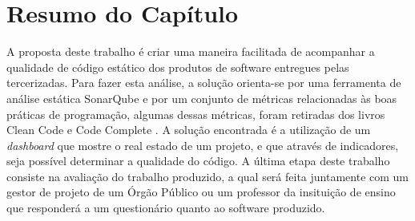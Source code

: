 \section{Resumo do Capítulo}
A proposta deste trabalho é criar uma maneira facilitada de acompanhar a qualidade de código estático dos produtos de software entregues pelas tercerizadas. Para fazer esta análise, a solução orienta-se por uma ferramenta de análise estática SonarQube e por um conjunto de métricas relacionadas às boas práticas de programação, algumas dessas métricas, foram retiradas dos livros Clean Code \cite{martin2009clean} e Code Complete \cite{mcconnell2004code}. A solução encontrada é a utilização de um \textit{dashboard} que mostre o real estado de um projeto, e que através de indicadores, seja possível determinar a qualidade do código. A última etapa deste trabalho consiste na avaliação do trabalho produzido, a qual será feita juntamente com um gestor de projeto de um Órgão Público ou um professor da insituição de ensino que responderá a um questionário quanto ao software produzido.